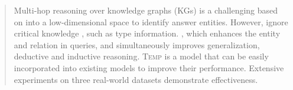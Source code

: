 \begin{abstract}
Multi-hop reasoning over  knowledge graphs (KGs)  is a  challenging  %
 based on  
into a  low-dimensional space  to identify answer entities. 
However,  ignore critical  knowledge , such as type information. %
, which enhances the entity and relation  in queries, and simultaneously improves  generalization, deductive and inductive reasoning. %
 \textsc{Temp} is a  model that can be easily incorporated into  existing  models to improve their performance. %
Extensive experiments on three real-world datasets %
demonstrate  effectiveness. %
\end{abstract}

